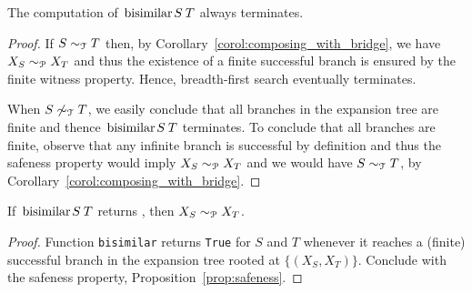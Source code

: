 \begin{lemma}[Termination]
\label{lem:termination}
	The computation of $\bisimf S T$ always terminates.
\end{lemma}
%
\begin{proof}
	If $S\sim_\mathcal T T$ then, by Corollary~\ref{corol:composing_with_bridge},
	we have $X_S\sim_\mathcal P X_T$ and thus the existence of a finite
	successful branch is ensured by the finite witness property. 
	Hence, breadth-first search eventually terminates. 
	
	When $S\not\sim_\mathcal T T$, we easily conclude that all branches
        in the expansion tree are finite and thence $\bisimf S T$
        terminates.  To conclude that all branches are finite, observe
        that any infinite branch is successful by definition and thus
        the safeness property would imply $X_S\sim_\mathcal P X_T$ and we
        would have $S\sim_\mathcal T T$, by 
        Corollary~\ref{corol:composing_with_bridge}.
\end{proof}


\begin{lemma}
  \label{lem:bisimilar-to-prod}
  If $\bisimf S T$ returns , then
  $X_{S} \sim_\mathcal P X_{T}$.
\end{lemma}

\begin{proof}
  Function \lstinline|bisimilar| returns \lstinline|True| for $S$ and
  $T$ whenever it reaches a (finite) successful branch in the expansion
  tree rooted at $\{(X_{S}, X_{T})\}$. Conclude with the safeness property,
  Proposition~\ref{prop:safeness}.
\end{proof}

